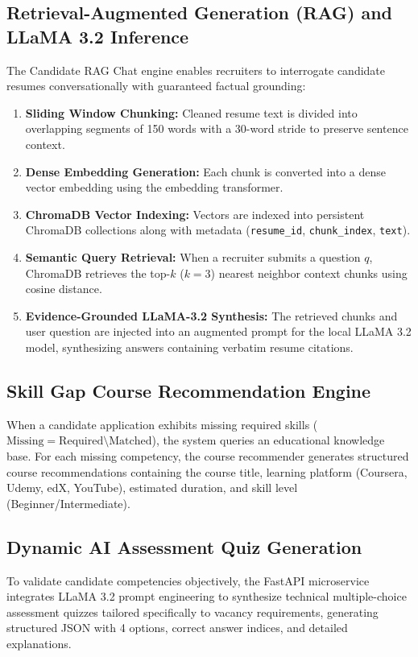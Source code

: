 \subsection{Retrieval-Augmented Generation (RAG) and LLaMA 3.2 Inference}
The Candidate RAG Chat engine enables recruiters to interrogate candidate resumes conversationally with guaranteed factual grounding:
\begin{enumerate}
    \item \textbf{Sliding Window Chunking:} Cleaned resume text is divided into overlapping segments of 150 words with a 30-word stride to preserve sentence context.
    \item \textbf{Dense Embedding Generation:} Each chunk is converted into a dense vector embedding using the embedding transformer.
    \item \textbf{ChromaDB Vector Indexing:} Vectors are indexed into persistent ChromaDB collections along with metadata (\texttt{resume\_id}, \texttt{chunk\_index}, \texttt{text}).
    \item \textbf{Semantic Query Retrieval:} When a recruiter submits a question $q$, ChromaDB retrieves the top-$k$ ($k=3$) nearest neighbor context chunks using cosine distance.
    \item \textbf{Evidence-Grounded LLaMA-3.2 Synthesis:} The retrieved chunks and user question are injected into an augmented prompt for the local LLaMA 3.2 model, synthesizing answers containing verbatim resume citations.
\end{enumerate}

\subsection{Skill Gap Course Recommendation Engine}
When a candidate application exhibits missing required skills ($\text{Missing} = \text{Required} \setminus \text{Matched}$), the system queries an educational knowledge base. For each missing competency, the course recommender generates structured course recommendations containing the course title, learning platform (Coursera, Udemy, edX, YouTube), estimated duration, and skill level (Beginner/Intermediate).

\subsection{Dynamic AI Assessment Quiz Generation}
To validate candidate competencies objectively, the FastAPI microservice integrates LLaMA 3.2 prompt engineering to synthesize technical multiple-choice assessment quizzes tailored specifically to vacancy requirements, generating structured JSON with 4 options, correct answer indices, and detailed explanations.

